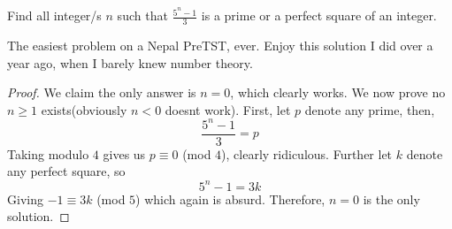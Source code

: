 \documentclass[11pt]{scrartcl}
\begin{document}
\begin{problem}
    Find all integer/s $n$ such that $\displaystyle{\frac{5^n-1}{3}}$ is a prime or a perfect square of an integer.
\end{problem}

\begin{remark}
    The easiest problem on a Nepal PreTST, ever. Enjoy this solution I did over a year ago, when I barely knew number theory.
\end{remark}

\begin{proof}
    We claim the only answer is $n=0$, which clearly works. We now prove no $n \ge 1$ exists(obviously $n<0$ doesnt work).
    First, let $p$ denote any prime, then,
    \[
    \frac{5^n-1}{3}=p
    \]
    Taking modulo $4$ gives us $p \equiv 0$ (mod $4$), clearly ridiculous. Further let $k$ denote any perfect square, so
    \[
    5^n-1=3k
    \]
    Giving $-1 \equiv 3k$ (mod $5$) which again is absurd. Therefore, $n=0$ is the only solution.
\end{proof}
\end{document}
